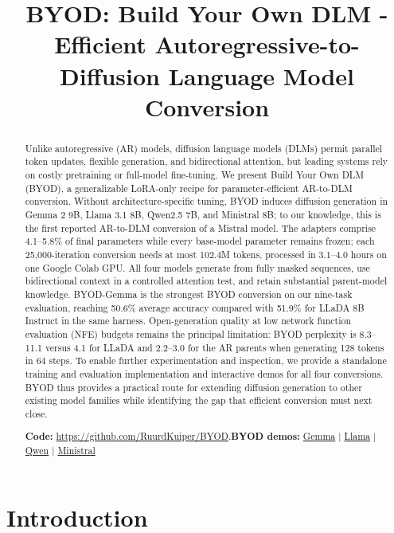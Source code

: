 \documentclass{article}
\title{BYOD: Build Your Own DLM - Efficient Autoregressive-to-Diffusion Language Model Conversion}
\begin{document}
\maketitle

\begin{abstract}
Unlike autoregressive (AR) models, diffusion language models (DLMs) permit parallel token updates, flexible generation, and bidirectional attention, but leading systems rely on costly pretraining or full-model fine-tuning. We present Build Your Own DLM (BYOD), a generalizable LoRA-only recipe for parameter-efficient AR-to-DLM conversion. Without architecture-specific tuning, BYOD induces diffusion generation in Gemma 2 9B, Llama 3.1 8B, Qwen2.5 7B, and Ministral 8B; to our knowledge, this is the first reported AR-to-DLM conversion of a Mistral model. The adapters comprise 4.1--5.8\% of final parameters while every base-model parameter remains frozen; each 25,000-iteration conversion needs at most 102.4M tokens, processed in 3.1--4.0 hours on one Google Colab GPU. All four models generate from fully masked sequences, use bidirectional context in a controlled attention test, and retain substantial parent-model knowledge. BYOD-Gemma is the strongest BYOD conversion on our nine-task evaluation, reaching 50.6\% average accuracy compared with 51.9\% for LLaDA 8B Instruct in the same harness. Open-generation quality at low network function evaluation (NFE) budgets remains the principal limitation: BYOD perplexity is 8.3--11.1 versus 4.1 for LLaDA and 2.2--3.0 for the AR parents when generating 128 tokens in 64 steps. To enable further experimentation and inspection, we provide a standalone training and evaluation implementation and interactive demos for all four conversions. BYOD thus provides a practical route for extending diffusion generation to other existing model families while identifying the gap that efficient conversion must next close.

\noindent\textbf{Code:} \url{https://github.com/RuurdKuiper/BYOD}.\quad\textbf{BYOD demos:}
\href{https://huggingface.co/spaces/Ruurd/byod-gemma-2-9b}{Gemma} $\mid$
\href{https://huggingface.co/spaces/Ruurd/byod-llama-3.1-8b}{Llama} $\mid$
\href{https://huggingface.co/spaces/Ruurd/byod-qwen2.5-7b}{Qwen} $\mid$
\href{https://huggingface.co/spaces/Ruurd/byod-ministral-8b}{Ministral}
\end{abstract}

\section{Introduction}
\end{document}
